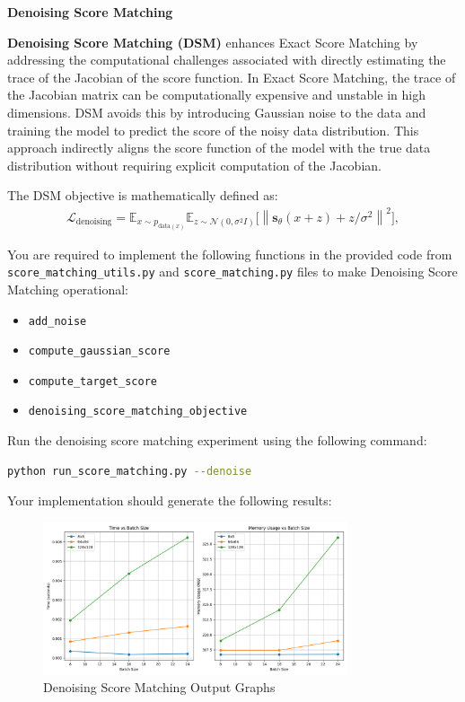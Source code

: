  \textbf{Denoising Score Matching}

\textbf{Denoising Score Matching (DSM)} enhances Exact Score Matching by addressing the computational challenges associated with directly estimating the trace of 
the Jacobian of the score function. In Exact Score Matching, the trace of the Jacobian matrix can be computationally expensive and 
unstable in high dimensions. DSM avoids this by introducing Gaussian noise to the data and training the model to predict the score of 
the noisy data distribution. This approach indirectly aligns the score function of the model with the true data distribution without 
requiring explicit computation of the Jacobian.

The DSM objective is mathematically defined as:
\begin{align}    
    \mathcal{L}_{\text{denoising}} = \mathbb{E}_{x \sim p_{\text{data}(x)}} \mathbb{E}_{z \sim \mathcal{N}(0, \sigma^2 I)} \Big[ \left\| \mathbf{s}_\theta(x + z) + z/\sigma^2 \right\|^2 \Big],
\end{align}


You are required to implement the following functions in the provided code from \texttt{score\_matching\_utils.py} and \texttt{score\_matching.py} files to make Denoising Score Matching operational:

\begin{itemize}
    \item \texttt{add\_noise}
    \item \texttt{compute\_gaussian\_score}
    \item \texttt{compute\_target\_score}
    \item \texttt{denoising\_score\_matching\_objective}
\end{itemize}

Run the denoising score matching experiment using the following command:
\begin{lstlisting}[language=bash]
    python run_score_matching.py --denoise
\end{lstlisting}

Your implementation should generate the following results:
\begin{figure}[H]
    \centering
    \includegraphics[width=0.8\textwidth]{./figures/denoising_results}
    \caption{Denoising Score Matching Output Graphs}
\end{figure}